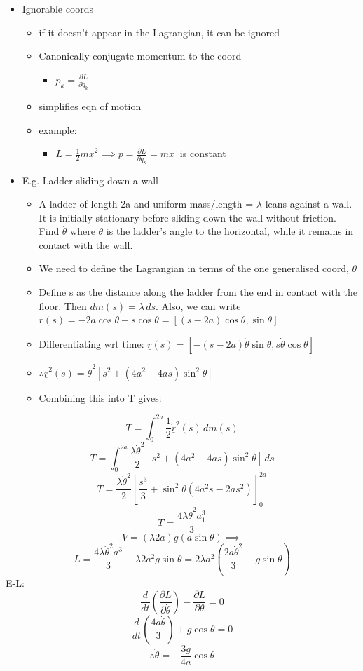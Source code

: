 \documentclass[a4paper,11pt,normalem]{article}
\begin{document}
\begin{itemize}
\item
  Ignorable coords
  \begin{itemize}
  \item
    if it doesn't appear in the Lagrangian, it can be ignored
  \item
    Canonically conjugate momentum to the coord
    \begin{itemize}
    \item
      \(p_k = \frac{\partial L}{\partial \dot{q}_k}\)
    \end{itemize}
  \item
    simplifies eqn of motion
  \item
    example:
    \begin{itemize}
    \item
      \(L = \frac{1}{2}m\dot{x}^2 \implies p = \frac{\partial L}{\partial \dot{q}_k} = m\dot{x}~\)
      is constant
    \end{itemize}
  \end{itemize}
\item
  E.g. Ladder sliding down a wall
  \begin{itemize}
  \item
    A ladder of length 2a and uniform mass/length = \(\lambda\) leans
    against a wall. It is initially stationary before sliding down the
    wall without friction. Find \(\ddot{\theta}\) where \(\theta\) is
    the ladder's angle to the horizontal, while it remains in contact
    with the wall.
  \item
    We need to define the Lagrangian in terms of the one generalised
    coord, \(\theta\)
  \item
    Define s as the distance along the ladder from the end in contact
    with the floor. Then \(dm(s) = \lambda\,ds\). Also, we can write
    \(\underline{r}(s) = -2a\cos{\theta} + s\cos{\theta} = [(s - 2a)\cos{\theta}, \sin{\theta}]\)
  \item
    Differentiating wrt time:
    \(\underline{\dot{r}}(s) = [-(s-2a)\dot{\theta}\sin{\theta},s\dot{\theta}\cos{\theta}]\)
  \item
    \(\therefore \underline{\dot{r}}^{2}(s) = \dot{\theta}^2 [s^2 + (4a^2 - 4as)\sin^{2}{\theta}]\)
  \item
    Combining this into T gives:
  \end{itemize}
\end{itemize}

\[
    T = \int_{0}^{2a} \frac{1}{2}\underline{\dot{r}}^{2}(s)\,dm(s)
\] \[
    T = \int_{0}^{2a} \frac{\lambda \dot{\theta}^2}{2}[s^2 + (4a^2 - 4as)\sin^{2}{\theta}] \, ds
\] \[
    T = \frac{\lambda \dot{\theta}^2}{2} [\frac{s^3}{3} + \sin^{2}{\theta} (4a^{2}s - 2as^2)]_{0}^{2a_{}}
\] \[
    T = \frac{4\lambda\dot{\theta}^{2}a_{1}^{3}}{3}
\] \[
    V = (\lambda 2a)g(a\sin{\theta}) \implies
\] \[
    L =  \frac{4\lambda\dot{\theta}^{2}a^{3}}{3} - \lambda 2a^{2}g\sin{\theta} = 2\lambda a^{2}(\frac{2a\dot{\theta}^2}{3} - g\sin{\theta})
\] E-L: \[
    \frac{d}{dt}(\frac{\partial L}{\partial \dot{\theta}}) - \frac{\partial L}{\partial \theta} = 0
\] \[
    \frac{d}{dt} (\frac{4a\dot{\theta}}{3}) + g\cos\theta = 0
\] \[
    \therefore \ddot{\theta} = -\frac{3g}{4a}\cos\theta
\]
\end{document}
